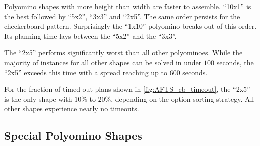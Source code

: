 Polyomino shapes with more height than width are faster to assemble.
``10x1'' is the best followed by ``5x2'', ``3x3'' and ``2x5''.
The same order persists for the checkerboard pattern.
Surprisingly the ``1x10'' polyomino breaks out of this order.
Its planning time lays between the ``5x2'' and the ``3x3''.

The ``2x5'' performs significantly worst than all other polyominoes.
While the majority of instances for all other shapes can be solved in under $100$ seconds, the ``2x5'' exceeds this time with a spread reaching up to $600$ seconds.

For the fraction of timed-out plans shown in \autoref{fig:AFTS_cb_timeout}, the ``2x5'' is the only shape with $10\%$ to $20\%$, depending on the option sorting strategy.
All other shapes experience nearly no timeouts.

\subsection{Special Polyomino Shapes}
\label{sec:special_poly}

